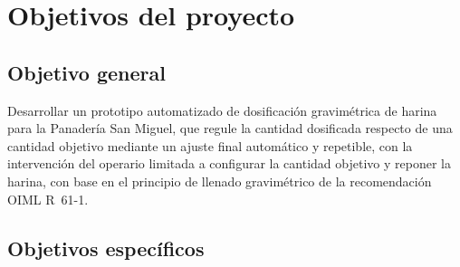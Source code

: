 
\section{Objetivos del proyecto}
\label{sec:objetivos}

\subsection{Objetivo general}
\label{subsec:objetivo_general}


Desarrollar un prototipo automatizado de dosificación gravimétrica de harina
para la Panadería San Miguel, que regule la cantidad dosificada respecto de
una cantidad objetivo mediante un ajuste final automático y repetible, con
la intervención del operario limitada a configurar la cantidad objetivo y
reponer la harina, con base en el principio de llenado gravimétrico de la
recomendación OIML R~61-1.

\subsection{Objetivos específicos}
\label{subsec:objetivos_especificos}



